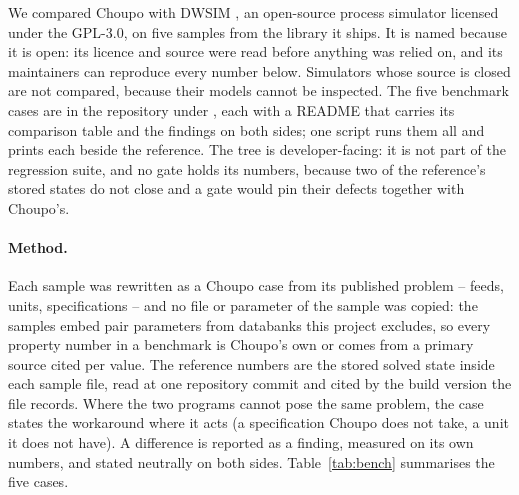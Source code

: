 \documentclass[11pt,a4paper]{article}
\newcommand{\code}[1]{\texttt{\detokenize{#1}}}
\begin{document}
We compared Choupo with DWSIM \citep{dwsim}, an open-source process
simulator licensed under the GPL-3.0, on five samples from the library it
ships.  It is named because it is open: its licence and source were read
before anything was relied on, and its maintainers can reproduce every
number below.  Simulators whose source is closed are not compared, because
their models cannot be inspected.  The five benchmark cases are in the
repository under \code{benchmarks/dwsim/}, each with a README that carries
its comparison table and the findings on both sides; one script runs them
all and prints each beside the reference.  The tree is developer-facing:
it is not part of the regression suite, and no gate holds its numbers,
because two of the reference's stored states do not close and a gate
would pin their defects together with Choupo's.

\paragraph{Method.}  Each sample was rewritten as a Choupo case from its
published problem -- feeds, units, specifications -- and no file or
parameter of the sample was copied: the samples embed pair parameters from
databanks this project excludes, so every property number in a benchmark
is Choupo's own or comes from a primary source cited per value.  The
reference numbers are the stored solved state inside each sample file,
read at one repository commit and cited by the build version the file
records.  Where the two programs cannot pose the same problem, the case
states the workaround where it acts (a specification Choupo does not take,
a unit it does not have).  A difference is reported as a finding, measured
on its own numbers, and stated neutrally on both sides.  Table~\ref{tab:bench}
summarises the five cases.
\end{document}
